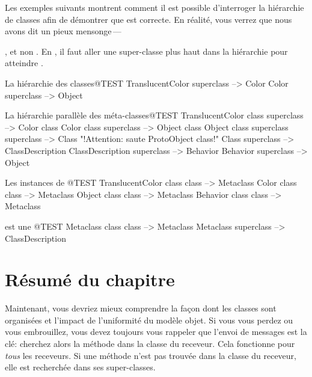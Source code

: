 \documentclass[a4paper,10pt,twoside]{book}
\begin{document}
Les exemples suivants montrent comment il est possible d'interroger la hiérarchie de classes afin de démontrer que  est correcte.
En réalité, vous verrez que nous avons dit un pieux mensonge\,---\, {, et non . En \sq, il faut aller une super-classe plus haut dans la hiérarchie pour atteindre .

\begin{example}{La hiérarchie des classes}{@TEST}
TranslucentColor superclass			-->		Color
Color superclass							-->		Object
\end{example}

\begin{example}{La hi{\'e}rarchie parall{\`e}le des méta-classes}{@TEST}
TranslucentColor class superclass   --> Color class
Color class superclass                     --> Object class
Object class superclass superclass --> Class    "!Attention: saute ProtoObject class!"
Class superclass                              --> ClassDescription
ClassDescription superclass            --> Behavior
Behavior superclass                         --> Object
\end{example}

\begin{example}{Les instances de }{@TEST}
TranslucentColor class class --> Metaclass
Color class class                   --> Metaclass
Object class class                 --> Metaclass
Behavior class class              --> Metaclass
\end{example}

\begin{example}{ est une }{@TEST}
Metaclass class class --> Metaclass
Metaclass superclass --> ClassDescription
\end{example}

\section{Résumé du chapitre}

Maintenant, vous devriez mieux comprendre la façon dont les classes sont organisées et l'impact de l'uniformité du modèle objet.
Si vous vous perdez ou vous embrouillez, vous devez toujours vous rappeler que l'envoi de messages est la clé: cherchez alors la méthode dans la classe du receveur.
Cela fonctionne pour \emph{tous} les receveurs.
Si une méthode n'est pas trouvée dans la classe du receveur, elle est recherchée dans ses super-classes.


}
\end{document}
